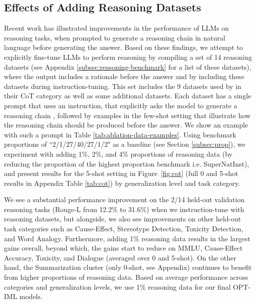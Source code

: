 \subsection{Effects of Adding Reasoning Datasets}
\label{sec:cot}
Recent work \citep{wei2022cot,kojima2022large} has illustrated improvements in the performance of LLMs on reasoning tasks, when prompted to generate a reasoning chain in natural language before generating the answer. Based on these findings, we attempt to explicitly fine-tune LLMs to perform reasoning by compiling a set of 14 reasoning datasets (see Appendix \ref{subsec:reasoning-benchmark} for a list of these datasets), where the output includes a rationale before the answer and by including these datasets during instruction-tuning. This set includes the 9 datasets used by \cite{chung2022flanpalm} in their CoT category as well as some additional datasets. Each dataset has a single prompt that uses an instruction, that explicitly asks the model to generate a reasoning chain \citep{kojima2022large}, followed by examples in the few-shot setting that illustrate how the reasoning chain should be produced before the answer. We show an example with such a prompt in Table \ref{tab:ablation-data-examples}. Using benchmark proportions of ``2/1/27/40/27/1/2" as a baseline (see Section \ref{subsec:prop}), we experiment with adding 1\%, 2\%, and 4\% proportions of reasoning data (by reducing the proportion of the highest proportion benchmark i.e. SuperNatInst), and present results for the 5-shot setting in Figure~\ref{fig:cot} (full 0 and 5-shot results in Appendix Table \ref{tab:cot}) by generalization level and task category. 

We see a substantial performance improvement on the 2/14 held-out validation reasoning tasks (Rouge-L from 12.2\% to 31.6\%) when we instruction-tune with reasoning datasets, but alongside, we also see improvements on other held-out task categories such as Cause-Effect, Stereotype Detection, Toxicity Detection, and Word Analogy. Furthermore, adding 1\% reasoning data results in the largest gains overall, beyond which, the gains start to reduce on MMLU, Cause-Effect Accuracy, Toxicity, and Dialogue (averaged over 0 and 5-shot). On the other hand, the Summarization cluster (only 0-shot, see Appendix) continues to benefit from higher proportions of reasoning data. Based on average performance across categories and generalization levels, we use 1\% reasoning data for our final OPT-IML models.

